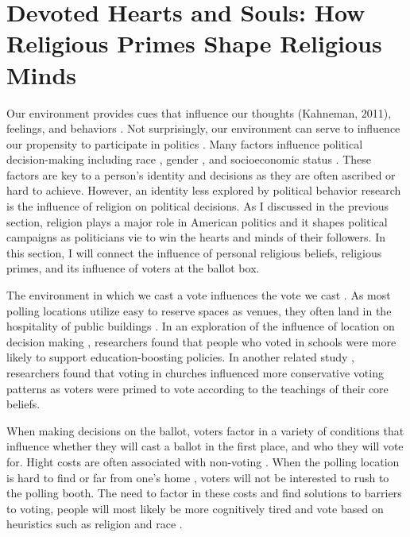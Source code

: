 \documentclass[letterpaper,man,natbib,noextraspace,12pt]{apa6}  %
\begin{document}
\section{Devoted Hearts and Souls: How Religious Primes Shape Religious Minds
}

Our environment provides cues that influence our thoughts (Kahneman, 2011), feelings, and behaviors \citep{cialdini_pre-suasion:_2016}. Not surprisingly, our environment can serve to influence our propensity to participate in politics \citep{barreto_are_2009}. Many factors influence political decision-making \citep{gelman_red_2010} including race \citep{mclaughlin_conditioned_2016}, gender \citep{lawless_it_2005}, and socioeconomic status \citep{gilens2012affluence}. These factors are key to a person’s identity and decisions as they are often ascribed or hard to achieve. However, an identity less explored by political behavior research is the influence of religion on political decisions. As I discussed in the previous section, religion plays a major role in American politics and it shapes political campaigns as politicians vie to win the hearts and minds of their followers. In this section, I will connect the influence of personal religious beliefs, religious primes, and its influence of voters at the ballot box. 

The environment in which we cast a vote influences the vote we cast \citep{berger_contextual_2008}. As most polling locations utilize easy to reserve spaces as venues, they often land in the hospitality of public buildings \citep{barreto_are_2009}. In an exploration of the influence of location on decision making \citep{berger_contextual_2008}, researchers found that people who voted in schools were more likely to support education-boosting policies. In another related study \citep{rutchick_deus_2010}, researchers found that voting in churches influenced more conservative voting patterns as voters were primed to vote according to the teachings of their core beliefs. 

When making decisions on the ballot, voters factor in a variety of conditions that influence whether they will cast a ballot in the first place, and who they will vote for. Hight costs are often associated with non-voting \citep{haspel_location_2005}. When the polling location is hard to find \citep{barreto_are_2009} or far from one’s home \citep{haspel_location_2005}, voters will not be interested to rush to the polling booth. The need to factor in these costs and find solutions to barriers to voting, people will most likely be more cognitively tired and vote based on heuristics such as religion and race \citep{weber_courting_2012}. 
\end{document}
